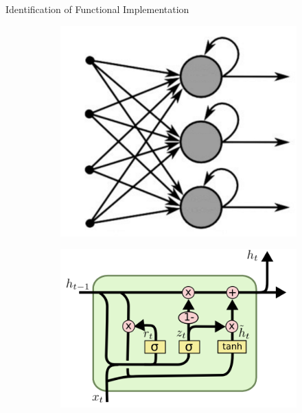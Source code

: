 \documentclass[xcolor=svgnames]{beamer}
\begin{document}
\begin{frame}[t]{Identification of Functional Implementation}
\begin{itemize}
{\begin{figure}
\begin{subfigure}{0.20\textwidth}
\end{subfigure}
\hfill
\begin{subfigure}{0.20\textwidth}
	\includegraphics[width=\textwidth]{rnn.png}
\end{subfigure}
\hfill
\begin{subfigure}{0.20\textwidth}
	\includegraphics[width=\textwidth]{lstm.png}
\end{subfigure}
\end{figure}
}
\end{itemize}

\end{frame}
\end{document}
